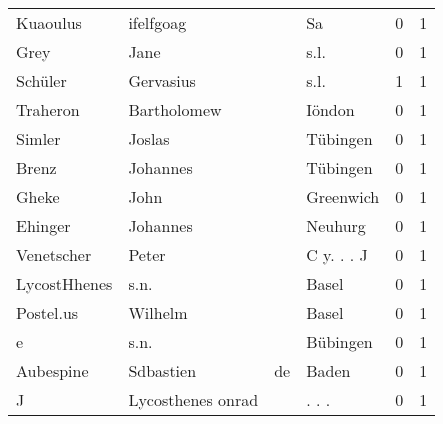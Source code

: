 \documentclass[10pt,a4paper,landscape]{article}
\begin{document}
\begin{longtable}{llllrr}
                 Kuaoulus &                          ifelfgoag &             &                                          Sa &          0 &         1 \\
                     Grey &                               Jane &             &                                        s.l. &          0 &         1 \\
                  Schüler &                          Gervasius &             &                                        s.l. &          1 &         1 \\
                 Traheron &                        Bartholomew &             &                                      Iöndon &          0 &         1 \\
                   Simler &                             Joslas &             &                                    Tübingen &          0 &         1 \\
                    Brenz &                           Johannes &             &                                    Tübingen &          0 &         1 \\
                    Gheke &                               John &             &                                   Greenwich &          0 &         1 \\
                  Ehinger &                           Johannes &             &                                     Neuhurg &          0 &         1 \\
               Venetscher &                              Peter &             &                                  C y. . . J &          0 &         1 \\
             LycostHhenes &                               s.n. &             &                                       Basel &          0 &         1 \\
                Postel.us &                            Wilhelm &             &                                       Basel &          0 &         1 \\
                        e &                               s.n. &             &                                    Bübingen &          0 &         1 \\
                Aubespine &                          Sdbastien &          de &                                       Baden &          0 &         1 \\
                        J &                  Lycosthenes onrad &             &                                      . . .  &          0 &         1 \\

\end{longtable}
\end{document}
